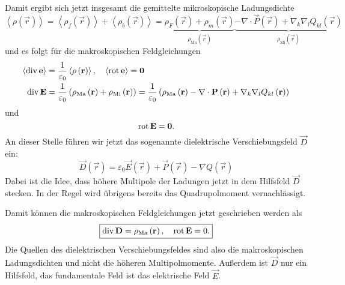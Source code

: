 Damit ergibt sich jetzt insgesamt die gemittelte mikroskopische Ladungsdichte
\begin{equation*}
	\left\langle \rho \left(\vec {r}\right)\right\rangle =\left\langle \rho _{f}\left(\vec {r}\right)\right\rangle +\left\langle \rho _{b}\left(\vec {r}\right)\right\rangle =\underset{\rho _{\mathrm{Ma}}\left(\vec {r}\right)}{\underbrace{\rho _{F}\left(\vec {r}\right)+\rho _{m}\left(\vec {r}\right)}}\underset{\rho _{\mathrm{Mi}}\left(\vec {r}\right)}{\underbrace{-\nabla \cdot \vec {P}\left(\vec {r}\right)+\nabla _{k}\nabla _{l}Q_{kl}\left(\vec {r}\right)}}
\end{equation*}
und es folgt für die makroskopischen Feldgleichungen
\begin{align*}
	\left\langle \operatorname{div} \mathbf{e}\right\rangle & =\frac{1}{\varepsilon _{0}}\left\langle \rho \left(\mathbf{r}\right)\right\rangle ,\quad \left\langle \operatorname{rot} \mathbf{e}\right\rangle =\mathbf{0}                                                                                                                                                               \\
	\operatorname{div} \mathbf{E}                           & =\frac{1}{\varepsilon _{0}}\left(\rho _{\mathrm{Ma}}\left(\mathbf{r}\right)+\rho _{\mathrm{Mi}}\left(\mathbf{r}\right)\right)=\frac{1}{\varepsilon _{0}}\left(\rho _{\mathrm{Ma}}\left(\mathbf{r}\right)-\nabla \cdot \mathbf{P}\left(\mathbf{r}\right)+\nabla _{k}\nabla _{l}Q_{kl}\left(\mathbf{r}\right)\right)
\end{align*}
und
\begin{equation*}
	\operatorname{rot} \mathbf{E}=\mathbf{0}.
\end{equation*}
An dieser Stelle führen wir jetzt das sogenannte dielektrische Verschiebungsfeld $\vec {D}$ ein:
\begin{equation*}
	\vec {D}\left(\vec {r}\right)=\varepsilon _{0}\vec {E}\left(\vec {r}\right)+\vec {P}\left(\vec {r}\right)-\nabla Q\left(\vec {r}\right)
\end{equation*}
Dabei ist die Idee, dass höhere Multipole der Ladungen jetzt in dem Hilfsfeld $\vec {D}$ stecken. In der Regel wird übrigens bereits das Quadrupolmoment vernachlässigt.

Damit können die makroskopischen Feldgleichungen jetzt geschrieben werden als
\begin{equation*}
	\boxed{\operatorname{div} \mathbf{D}=\rho _{\mathrm{Ma}}\left(\mathbf{r}\right), \quad\operatorname{rot} \mathbf{E}=0.}
\end{equation*}
Die Quellen des dielektrischen Verschiebungsfeldes sind also die makroskopischen Ladungsdichten und nicht die höheren Multipolmomente. Außerdem ist $\vec {D}$ nur ein Hilfsfeld, das fundamentale Feld ist das elektrische Feld $\vec {E}$.

